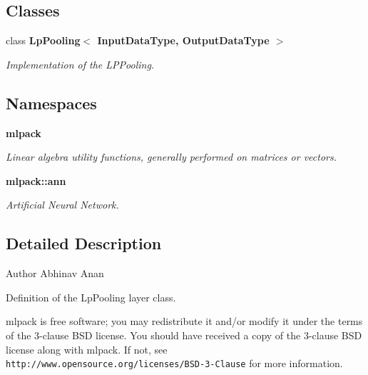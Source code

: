 \subsection*{Classes}
\begin{DoxyCompactItemize}
\item 
class \textbf{ Lp\+Pooling$<$ Input\+Data\+Type, Output\+Data\+Type $>$}
\begin{DoxyCompactList}\small\item\em Implementation of the L\+P\+Pooling. \end{DoxyCompactList}\end{DoxyCompactItemize}
\subsection*{Namespaces}
\begin{DoxyCompactItemize}
\item 
 \textbf{ mlpack}
\begin{DoxyCompactList}\small\item\em Linear algebra utility functions, generally performed on matrices or vectors. \end{DoxyCompactList}\item 
 \textbf{ mlpack\+::ann}
\begin{DoxyCompactList}\small\item\em Artificial Neural Network. \end{DoxyCompactList}\end{DoxyCompactItemize}


\subsection{Detailed Description}
\begin{DoxyAuthor}{Author}
Abhinav Anan
\end{DoxyAuthor}
Definition of the Lp\+Pooling layer class.

mlpack is free software; you may redistribute it and/or modify it under the terms of the 3-\/clause B\+SD license. You should have received a copy of the 3-\/clause B\+SD license along with mlpack. If not, see {\tt http\+://www.\+opensource.\+org/licenses/\+B\+S\+D-\/3-\/\+Clause} for more information. 